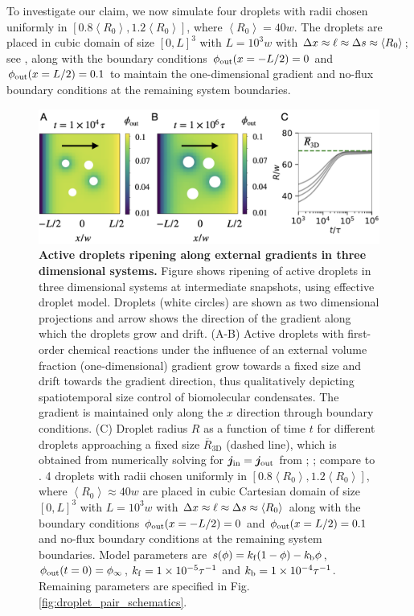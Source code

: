 To investigate our claim, we now simulate four droplets with radii chosen uniformly in $[0.8 \left \langle R_0 \right \rangle, 1.2 \left \langle R_0 \right \rangle]$, where $\left \langle R_0 \right \rangle = 40w$.
The droplets are placed in cubic domain of size $[0, L]^3$ with $L = 10^3 w$ with $\Delta x \approx \ell \approx \Delta s \approx \left \langle R_0 \right \rangle$; see , along with the boundary conditions $\phi_\mathrm{out}(x = -L/2) = 0$ and $\phi_\mathrm{out}(x = L/2) = 0.1$ to maintain the one-dimensional gradient and no-flux boundary conditions at the remaining system boundaries.
\begin{figure}[tb]
\centering
\includegraphics[scale=0.52]{MainContent/Figures/active_emulsion_gradient.pdf}
\vspace{10pt}
\caption{\textbf{Active droplets ripening along external gradients in three dimensional systems.}
Figure shows ripening of active droplets in three dimensional systems at intermediate snapshots, using effective droplet model. Droplets (white circles) are shown as two dimensional projections and arrow shows the direction of the gradient along which the droplets grow and drift.
\mbox{(A-B)} Active droplets with first-order chemical reactions under the influence of an external volume fraction (one-dimensional) gradient grow towards a fixed size and drift towards the gradient direction, thus qualitatively depicting spatiotemporal size control of biomolecular condensates.
The gradient is maintained only along the $x$ direction through boundary conditions.
(C) Droplet radius $R$ as a function of time $t$ for different droplets approaching a fixed size $\overline{R}_\mathrm{3D}$ (dashed line), which is obtained from numerically solving for $\boldsymbol{j}_\mathrm{in} = \boldsymbol{j}_\mathrm{out}$ from ; ; compare to .
4 droplets with radii chosen uniformly in $[0.8 \left \langle R_0 \right \rangle, 1.2 \left \langle R_0 \right \rangle]$, where $\left \langle R_0 \right \rangle \approx 40 w$ are placed in cubic Cartesian domain of size $[0, L]^3$ with $L = 10^3 w$ with $\Delta x \approx \ell \approx \Delta s \approx \left \langle R_0 \right \rangle$ along with the boundary conditions $\phi_\mathrm{out}(x = -L/2) = 0$ and $\phi_\mathrm{out}(x = L/2) = 0.1$ and no-flux boundary conditions at the remaining system boundaries.
Model parameters are $s(\phi)= k_\mathrm{f} (1 - \phi) - k_\mathrm{b} \phi$, $\phi_\mathrm{out}(t=0) =\phi_\infty$, $k_\mathrm{f} = 1 \times 10^{-5} \tau^{-1}$ and $k_\mathrm{b} = 1 \times 10^{-4} \tau^{-1}$.
Remaining parameters are specified in Fig. \ref{fig:droplet_pair_schematics}.
}
\label{fig:active_emulsion_gradient}
\end{figure}
